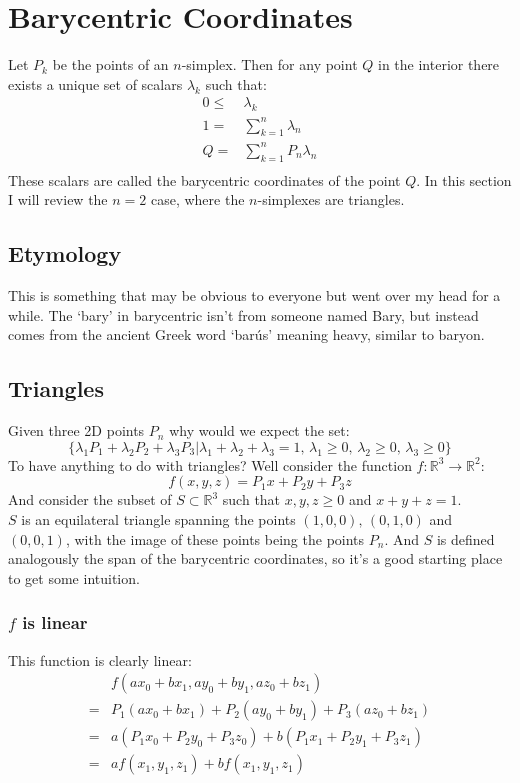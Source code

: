 
\section{Barycentric Coordinates}
Let $P_k$ be the points of an $n$-simplex.
Then for any point $Q$ in the interior there exists a unique set of scalars $\lambda_k$ such that:
\begin{equation*}
\begin{aligned}
	0\leq&\lambda_k\\
	1=&\sum_{k=1}^n\lambda_n\\
	Q=&\sum_{k=1}^nP_n\lambda_n\\
\end{aligned}
\end{equation*}
These scalars are called the barycentric coordinates of the point $Q$.
In this section I will review the $n=2$ case, where the $n$-simplexes are triangles.

\subsection{Etymology}	
This is something that may be obvious to everyone but went over my head for a while.
The `bary' in barycentric isn't from someone named Bary,
but instead comes from the ancient Greek word `barús' meaning heavy,
similar to baryon.

\subsection{Triangles}
Given three 2D points $P_n$ why would we expect the set:
\[\{\lambda_1P_1+\lambda_2P_2+\lambda_3P_3|\lambda_1+\lambda_2+\lambda_3 = 1,\,\lambda_1 \geq 0,\,\lambda_2 \geq 0,\,\lambda_3 \geq 0\}\]
To have anything to do with triangles?
Well consider the function $f:\mathbb{R}^3\rightarrow\mathbb{R}^2$:
\[f(x,y,z) = P_1x+P_2y+P_3z\]
And consider the subset of $S\subset\mathbb{R}^3$ such that $x,y,z\geq0$ and $x+y+z=1$.
\\

$S$ is an equilateral triangle spanning the points $(1,0,0),\,(0,1,0)$ and $(0,0,1)$,
with the image of these points being the points $P_n$.
And $S$ is defined analogously the span of the barycentric coordinates,
so it's a good starting place to get some intuition.

\subsubsection{$f$ is linear}
This function is clearly linear:
\begin{equation*}
\begin{aligned}
	&f(ax_0+bx_1,ay_0+by_1,az_0+bz_1)\\
	=&P_1(ax_0+bx_1) + P_2(ay_0+by_1)+P_3(az_0+bz_1)\\
	=&a(P_1x_0+P_2y_0+P_3z_0) + b(P_1x_1+P_2y_1+P_3z_1)\\
	=&af(x_1,y_1,z_1)+bf(x_1,y_1,z_1)\\
\end{aligned}
\end{equation*}

